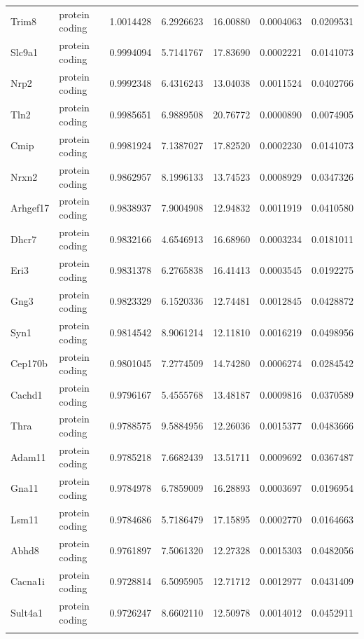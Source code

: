 \documentclass[onehalf,12pt]{beavtex}
\begin{document}
\begin{longtable}{llrrrrr}
  \addlinespace
  Trim8 & protein coding & 1.0014428 & 6.2926623 & 16.00880 & 0.0004063 & 0.0209531\\
  Slc9a1 & protein coding & 0.9994094 & 5.7141767 & 17.83690 & 0.0002221 & 0.0141073\\
  Nrp2 & protein coding & 0.9992348 & 6.4316243 & 13.04038 & 0.0011524 & 0.0402766\\
  Tln2 & protein coding & 0.9985651 & 6.9889508 & 20.76772 & 0.0000890 & 0.0074905\\
  Cmip & protein coding & 0.9981924 & 7.1387027 & 17.82520 & 0.0002230 & 0.0141073\\
  \addlinespace
  Nrxn2 & protein coding & 0.9862957 & 8.1996133 & 13.74523 & 0.0008929 & 0.0347326\\
  Arhgef17 & protein coding & 0.9838937 & 7.9004908 & 12.94832 & 0.0011919 & 0.0410580\\
  Dhcr7 & protein coding & 0.9832166 & 4.6546913 & 16.68960 & 0.0003234 & 0.0181011\\
  Eri3 & protein coding & 0.9831378 & 6.2765838 & 16.41413 & 0.0003545 & 0.0192275\\
  Gng3 & protein coding & 0.9823329 & 6.1520336 & 12.74481 & 0.0012845 & 0.0428872\\
  \addlinespace
  Syn1 & protein coding & 0.9814542 & 8.9061214 & 12.11810 & 0.0016219 & 0.0498956\\
  Cep170b & protein coding & 0.9801045 & 7.2774509 & 14.74280 & 0.0006274 & 0.0284542\\
  Cachd1 & protein coding & 0.9796167 & 5.4555768 & 13.48187 & 0.0009816 & 0.0370589\\
  Thra & protein coding & 0.9788575 & 9.5884956 & 12.26036 & 0.0015377 & 0.0483666\\
  Adam11 & protein coding & 0.9785218 & 7.6682439 & 13.51711 & 0.0009692 & 0.0367487\\
  \addlinespace
  Gna11 & protein coding & 0.9784978 & 6.7859009 & 16.28893 & 0.0003697 & 0.0196954\\
  Lsm11 & protein coding & 0.9784686 & 5.7186479 & 17.15895 & 0.0002770 & 0.0164663\\
  Abhd8 & protein coding & 0.9761897 & 7.5061320 & 12.27328 & 0.0015303 & 0.0482056\\
  Cacna1i & protein coding & 0.9728814 & 6.5095905 & 12.71712 & 0.0012977 & 0.0431409\\
  Sult4a1 & protein coding & 0.9726247 & 8.6602110 & 12.50978 & 0.0014012 & 0.0452911\\
  \addlinespace

\end{longtable}
\end{document}
